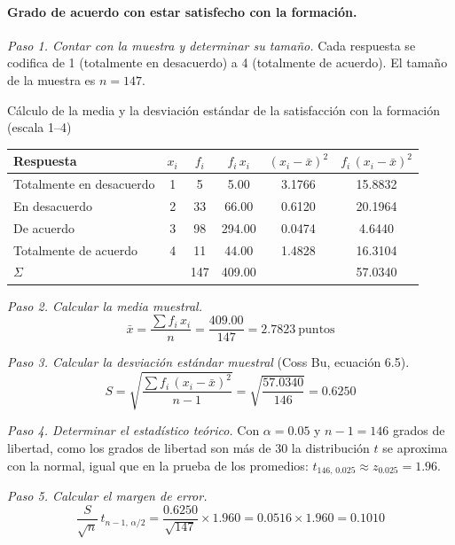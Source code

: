 \paragraph{Grado de acuerdo con estar satisfecho con la formación.}

\textit{Paso 1. Contar con la muestra y determinar su tamaño.} Cada respuesta se codifica de 1 (totalmente en desacuerdo) a 4 (totalmente de acuerdo). El tamaño de la muestra es $n = 147$.

\begin{mitabla}{Cálculo de la media y la desviación estándar de la satisfacción con la formación (escala 1--4)}
\begin{tabular}{lccccc}
\toprule
Respuesta & $x_i$ & $f_i$ & $f_i\,x_i$ & $(x_i-\bar{x})^2$ & $f_i\,(x_i-\bar{x})^2$ \\
\midrule
Totalmente en desacuerdo & 1 & 5 & 5.00 & 3.1766 & 15.8832 \\
En desacuerdo & 2 & 33 & 66.00 & 0.6120 & 20.1964 \\
De acuerdo & 3 & 98 & 294.00 & 0.0474 & 4.6440 \\
Totalmente de acuerdo & 4 & 11 & 44.00 & 1.4828 & 16.3104 \\
\midrule
$\Sigma$ & & 147 & 409.00 & & 57.0340 \\
\bottomrule
\end{tabular}
\end{mitabla}

\textit{Paso 2. Calcular la media muestral.}
\[
\bar{x} = \frac{\sum f_i\,x_i}{n} = \frac{409.00}{147} = 2.7823\ \text{puntos}
\]

\textit{Paso 3. Calcular la desviación estándar muestral} (Coss Bu, ecuación 6.5).
\[
S = \sqrt{\frac{\sum f_i\,(x_i-\bar{x})^2}{n-1}} = \sqrt{\frac{57.0340}{146}} = 0.6250
\]

\textit{Paso 4. Determinar el estadístico teórico.} Con $\alpha = 0.05$ y $n-1 = 146$ grados de libertad, como los grados de libertad son más de 30 la distribución $t$ se aproxima con la normal, igual que en la prueba de los promedios: $t_{146,\,0.025} \approx z_{0.025} = 1.96$.

\textit{Paso 5. Calcular el margen de error.}
\[
\frac{S}{\sqrt{n}}\,t_{n-1,\,\alpha/2} = \frac{0.6250}{\sqrt{147}}\times 1.960 = 0.0516 \times 1.960 = 0.1010
\]

